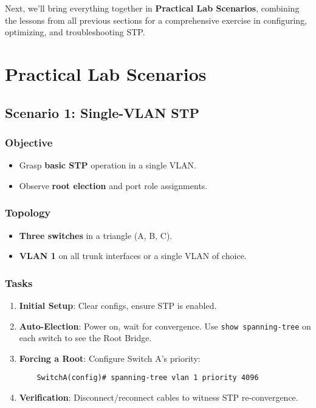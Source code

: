 \documentclass[a4paper]{report}
\begin{document}
Next, we’ll bring everything together in \textbf{Practical Lab Scenarios}, combining the lessons from all previous sections for a comprehensive exercise in configuring, optimizing, and troubleshooting STP.

\chapter{Practical Lab Scenarios}

\section{Scenario 1: Single-VLAN STP}
\subsection{Objective}
\begin{itemize}
    \item Grasp \textbf{basic STP} operation in a single VLAN.
    \item Observe \textbf{root election} and port role assignments.
\end{itemize}

\subsection{Topology}
\begin{itemize}
    \item \textbf{Three switches} in a triangle (A, B, C).
    \item \textbf{VLAN 1} on all trunk interfaces or a single VLAN of choice.
\end{itemize}

\subsection{Tasks}
\begin{enumerate}
    \item \textbf{Initial Setup}: Clear configs, ensure STP is enabled.
    \item \textbf{Auto-Election}: Power on, wait for convergence. Use \texttt{show spanning-tree} on each switch to see the Root Bridge.
    \item \textbf{Forcing a Root}: Configure Switch A’s priority:
    \begin{lstlisting}
    SwitchA(config)# spanning-tree vlan 1 priority 4096
    \end{lstlisting}
    \item \textbf{Verification}: Disconnect/reconnect cables to witness STP re-convergence.
\end{enumerate}
\end{document}
